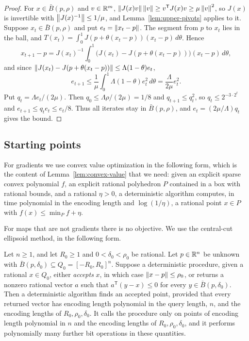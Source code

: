 \begin{proof}
For $x\in\bar B(p,\rho)$ and $v\in\mathbb R^m$, $\left\lVert J(x)v\right\rVert\left\lVert v\right\rVert\ge
v^{\mathsf T}J(x)v\ge\mu\left\lVert v\right\rVert^2$, so $J(x)$ is invertible with
$\left\lVert J(x)^{-1}\right\rVert\le1/\mu$, and Lemma~\ref{lem:upper-pivots} applies to it.
Suppose $x_t\in\bar B(p,\rho)$ and put $e_t=\left\lVert x_t-p\right\rVert$. The segment from
$p$ to $x_t$ lies in the ball, and
$T(x_t)=\int_0^1J(p+\theta(x_t-p))(x_t-p)\,d\theta$. Hence
\[
 x_{t+1}-p=J(x_t)^{-1}\int_0^1\bigl(J(x_t)-J(p+\theta(x_t-p))\bigr)
 (x_t-p)\,d\theta,
\]
and since $\left\lVert J(x_t)-J(p+\theta(x_t-p))\right\rVert\le\Lambda(1-\theta)e_t$,
\[
 e_{t+1}\le\frac1\mu\int_0^1\Lambda(1-\theta)e_t^2\,d\theta
 =\frac{\Lambda}{2\mu}e_t^2.
\]
Put $q_t=\Lambda e_t/(2\mu)$. Then $q_0\le\Lambda\rho/(2\mu)=1/8$ and
$q_{t+1}\le q_t^2$, so $q_t\le2^{-3\cdot2^t}$ and $e_{t+1}\le q_te_t\le
e_t/8$. Thus all iterates stay in $\bar B(p,\rho)$, and
$e_t=(2\mu/\Lambda)q_t$ gives the bound.
\end{proof}

\subsection{Starting points}
\label{app:upper-warm}

For gradients we use convex value optimization in the following form, which
is the content of Lemma~\ref{lem:convex-value} that we need: given an
explicit sparse convex polynomial $f$, an explicit rational polyhedron $P$
contained in a box with rational bounds, and a rational $\eta>0$, a
deterministic algorithm computes, in time polynomial in the encoding length
and $\log(1/\eta)$, a rational point $x\in P$ with $f(x)\le\min_Pf+\eta$.

For maps that are not gradients there is no objective. We use the
central-cut ellipsoid method, in the following form.

\begin{lemma}
\label{lem:upper-warm-start}
Let $n\ge1$, and let $R_0\ge1$ and $0<\delta_0<\rho_0$ be rational. Let
$p\in\mathbb R^n$ be unknown with $\bar B(p,\delta_0)\subseteq
Q_0=[-R_0,R_0]^n$. Suppose a deterministic procedure, given a rational
$x\in Q_0$, either \emph{accepts} $x$, in which case $\left\lVert x-p\right\rVert\le\rho_0$,
or returns a nonzero rational vector $a$ such that $a^{\mathsf T}(y-x)\le0$
for every $y\in\bar B(p,\delta_0)$. Then a deterministic algorithm finds an
accepted point, provided that every returned vector has encoding length
polynomial in the query length, $n$, and the encoding lengths of
$R_0,\rho_0,\delta_0$. It calls the procedure only on points of encoding length
polynomial in $n$ and the encoding lengths of $R_0,\rho_0,\delta_0$, and it
performs polynomially many further bit operations in these quantities.
\end{lemma}

